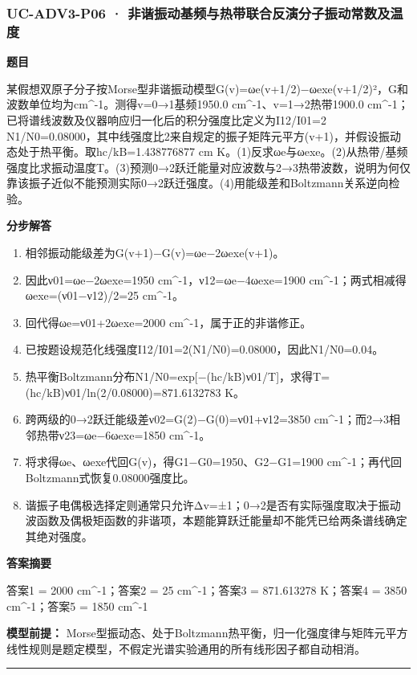 \documentclass[UTF8,11pt,a4paper]{ctexart}
\begin{document}
\subsubsection*{UC-ADV3-P06 · 非谐振动基频与热带联合反演分子振动常数及温度}
\noindent\textbf{题目}\par
某假想双原子分子按Morse型非谐振动模型G(v)=ωe(v+1/2)−ωexe(v+1/2)²，G和波数单位均为cm\textasciicircum{}-1。测得v=0→1基频1950.0 cm\textasciicircum{}-1、v=1→2热带1900.0 cm\textasciicircum{}-1；已将谱线波数及仪器响应归一化后的积分强度比定义为I12/I01=2 N1/N0=0.08000，其中线强度比2来自规定的振子矩阵元平方(v+1)，并假设振动态处于热平衡。取hc/kB=1.438776877 cm K。(1)反求ωe与ωexe。(2)从热带/基频强度比求振动温度T。(3)预测0→2跃迁能量对应波数与2→3热带波数，说明为何仅靠该振子近似不能预测实际0→2跃迁强度。(4)用能级差和Boltzmann关系逆向检验。\par
\medskip\noindent\textbf{分步解答}
\begin{enumerate}
\item 相邻振动能级差为G(v+1)−G(v)=ωe−2ωexe(v+1)。
\item 因此ν01=ωe−2ωexe=1950 cm\textasciicircum{}-1，ν12=ωe−4ωexe=1900 cm\textasciicircum{}-1；两式相减得ωexe=(ν01−ν12)/2=25 cm\textasciicircum{}-1。
\item 回代得ωe=ν01+2ωexe=2000 cm\textasciicircum{}-1，属于正的非谐修正。
\item 已按题设规范化线强度I12/I01=2(N1/N0)=0.08000，因此N1/N0=0.04。
\item 热平衡Boltzmann分布N1/N0=exp[−(hc/kB)ν01/T]，求得T=(hc/kB)ν01/ln(2/0.08000)=871.6132783 K。
\item 跨两级的0→2跃迁能级差ν02=G(2)−G(0)=ν01+ν12=3850 cm\textasciicircum{}-1；而2→3相邻热带ν23=ωe−6ωexe=1850 cm\textasciicircum{}-1。
\item 将求得ωe、ωexe代回G(v)，得G1−G0=1950、G2−G1=1900 cm\textasciicircum{}-1；再代回Boltzmann式恢复0.08000强度比。
\item 谐振子电偶极选择定则通常只允许Δv=±1；0→2是否有实际强度取决于振动波函数及偶极矩函数的非谐项，本题能算跃迁能量却不能凭已给两条谱线确定其绝对强度。
\end{enumerate}
\noindent\textbf{答案摘要}\par
答案1 = 2000 cm\textasciicircum{}-1；答案2 = 25 cm\textasciicircum{}-1；答案3 = 871.613278 K；答案4 = 3850 cm\textasciicircum{}-1；答案5 = 1850 cm\textasciicircum{}-1\par
\noindent\textbf{模型前提：}
Morse型振动态、处于Boltzmann热平衡，归一化强度律与矩阵元平方线性规则是题定模型，不假定光谱实验通用的所有线形因子都自动相消。\par
\medskip\hrule\medskip
\end{document}
